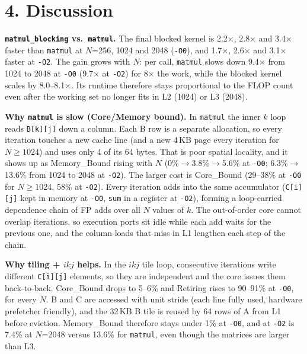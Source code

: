 \documentclass[10pt]{article}
\begin{document}
\section*{4. Discussion}
\textbf{\texttt{matmul\_blocking} vs.\ \texttt{matmul}.} The final blocked kernel is 2.2$\times$, 2.8$\times$ and 3.4$\times$ faster than \texttt{matmul} at $N$=256, 1024 and 2048 (\texttt{-O0}), and 1.7$\times$, 2.6$\times$ and 3.1$\times$ faster at \texttt{-O2}. The gain grows with $N$: per call, \texttt{matmul} slows down 9.4$\times$ from 1024 to 2048 at \texttt{-O0} (9.7$\times$ at \texttt{-O2}) for 8$\times$ the work, while the blocked kernel scales by 8.0--8.1$\times$. Its runtime therefore stays proportional to the FLOP count even after the working set no longer fits in L2 (1024) or L3 (2048).

\textbf{Why \texttt{matmul} is slow (Core/Memory bound).} In \texttt{matmul} the inner $k$ loop reads \texttt{B[k][j]} down a column. Each B row is a separate allocation, so every iteration touches a new cache line (and a new 4\,KB page every iteration for $N\geq1024$) and uses only 4 of its 64 bytes. That is poor spatial locality, and it shows up as Memory\_Bound rising with $N$ (0\%$\to$3.8\%$\to$5.6\% at \texttt{-O0}; 6.3\%$\to$13.6\% from 1024 to 2048 at \texttt{-O2}). The larger cost is Core\_Bound (29--38\% at \texttt{-O0} for $N\geq1024$, 58\% at \texttt{-O2}). Every iteration adds into the same accumulator (\texttt{C[i][j]} kept in memory at \texttt{-O0}, \texttt{sum} in a register at \texttt{-O2}), forming a loop-carried dependence chain of FP adds over all $N$ values of $k$. The out-of-order core cannot overlap iterations, so execution ports sit idle while each add waits for the previous one, and the column loads that miss in L1 lengthen each step of the chain.

\textbf{Why tiling + $ikj$ helps.} In the $ikj$ tile loop, consecutive iterations write different \texttt{C[i][j]} elements, so they are independent and the core issues them back-to-back. Core\_Bound drops to 5--6\% and Retiring rises to 90--91\% at \texttt{-O0}, for every $N$. B and C are accessed with unit stride (each line fully used, hardware prefetcher friendly), and the 32\,KB B tile is reused by 64 rows of A from L1 before eviction. Memory\_Bound therefore stays under 1\% at \texttt{-O0}, and at \texttt{-O2} is 7.4\% at $N$=2048 versus 13.6\% for \texttt{matmul}, even though the matrices are larger than L3.
\end{document}
